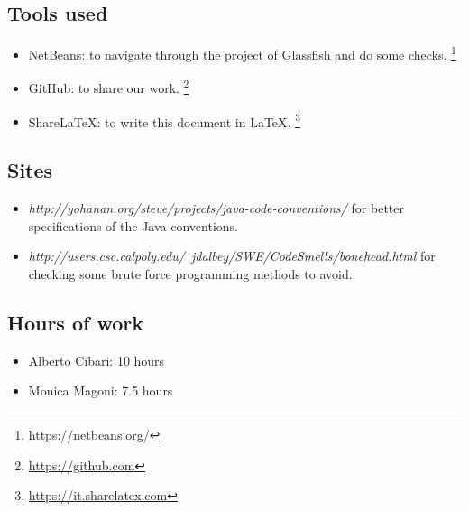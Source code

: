 \subsection*{Tools used}
    \begin{itemize}
        \item NetBeans: to navigate through the project of Glassfish and do some checks. 
            \footnote{\url{https://netbeans.org/}} 
        \item GitHub: to share our work. 
            \footnote{\url{https://github.com}} 
        \item ShareLaTeX: to write this document in LaTeX. 
            \footnote{\url{https://it.sharelatex.com}}
    \end{itemize}

\subsection*{Sites}
    \begin{itemize}
        \item \textit{http://yohanan.org/steve/projects/java-code-conventions/} for better specifications of the Java conventions.
        \item \textit{http://users.csc.calpoly.edu/~jdalbey/SWE/CodeSmells/bonehead.html} for checking some brute force programming methods to avoid.
    \end{itemize}

\subsection*{Hours of work}
    \begin{itemize}
    \item Alberto Cibari: 10 hours
    \item Monica Magoni:  7.5 hours
    \end{itemize}
